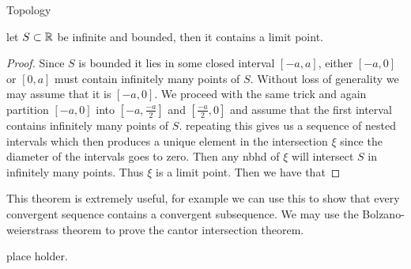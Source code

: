 \begin{chapter}{Topology}
    
    
    \begin{thm}
        let $S \subset \mathbb{R}$ be infinite and bounded, then it contains a limit point. 
    \end{thm}

    \begin{proof}
        Since $S$ is bounded it lies in some closed interval $[-a, a]$, either $[-a, 0]$ or $[0, a]$ must contain infinitely many points of $S$. 
        Without loss of generality we may assume that it is $[-a, 0]$. We proceed with the same trick and again partition $[-a, 0]$ into 
        $[-a, \frac{-a}{2}]$ and $[\frac{-a}{2}, 0]$ and assume that the first interval contains infinitely many points of $S$. 
        repeating this gives us a sequence of nested intervals which then produces a unique element in the intersection $\xi$ since the diameter of 
        the intervals goes to zero. Then any nbhd of $\xi$ will intersect $S$ in infinitely many points. Thus $\xi$ is a limit point. 
        Then we have that 
    \end{proof}

    This theorem is extremely useful, for example we can use this to show that every convergent sequence contains a convergent subsequence. 
    We may use the Bolzano-weierstrass theorem to prove the cantor intersection theorem. 

    
    \begin{thm}
        place holder.
    \end{thm}
\end{chapter}